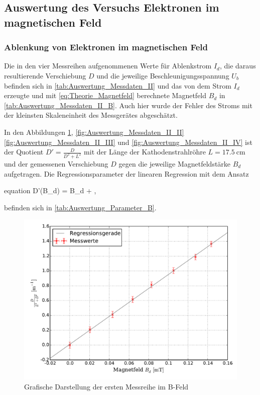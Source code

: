 		
\subsection{Auswertung des Versuchs Elektronen im magnetischen Feld}

	\subsubsection{Ablenkung von Elektronen im magnetischen Feld}
	
		Die in den vier Messreihen aufgenommenen Werte für Ablenkstrom $I_{d}$,
		die daraus resultierende Verschiebung $D$ und die jeweilige 
		Beschleunigungsspannung $U_{b}$ befinden sich in 
		\cref{tab:Auswertung_Messdaten_II} und das von dem Strom $I_{d}$ 
		erzeugte und mit \cref{eq:Theorie_Magnetfeld} berechnete Magnetfeld $B_{d}$ in 
		\cref{tab:Auswertung_Messdaten_II_B}. Auch hier wurde der Fehler des Stroms 
		mit der kleinsten Skaleneinheit des Messgerätes abgeschätzt.
		
		
		
		
		In den Abbildungen \ref{fig:Auswertung_Messdaten_II_I}, \ref{fig:Auswertung_Messdaten_II_II}
		\ref{fig:Auswertung_Messdaten_II_III} und \ref{fig:Auswertung_Messdaten_II_IV}
		ist der Quotient $D'=\frac{D}{D^{2} + L^{2}}$ mit der Länge der Kathodenstrahlröhre 
		$L = \SI{17.5}{\centi\meter}$ und der gemessenen Verschiebung $D$ gegen die
		jeweilige Magnetfeldstärke $B_{d}$ aufgetragen.
		Die Regressionsparameter der linearen Regression mit dem Ansatz
		\begin{empheq}{equation}
			D'(B_{d}) = \gamma \cdot B_{d} + \delta,
		\end{empheq} 
		befinden sich in \cref{tab:Auswertung_Parameter_B}.
		
		
		
		\begin{figure}[!h]
				\includegraphics[scale=0.7]{Grafiken/BFeld_Messreihe_I.pdf}
				\caption{Grafische Darstellung der ersten Messreihe im B-Feld}\label{fig:Auswertung_Messdaten_II_I}
		\end{figure}
		
